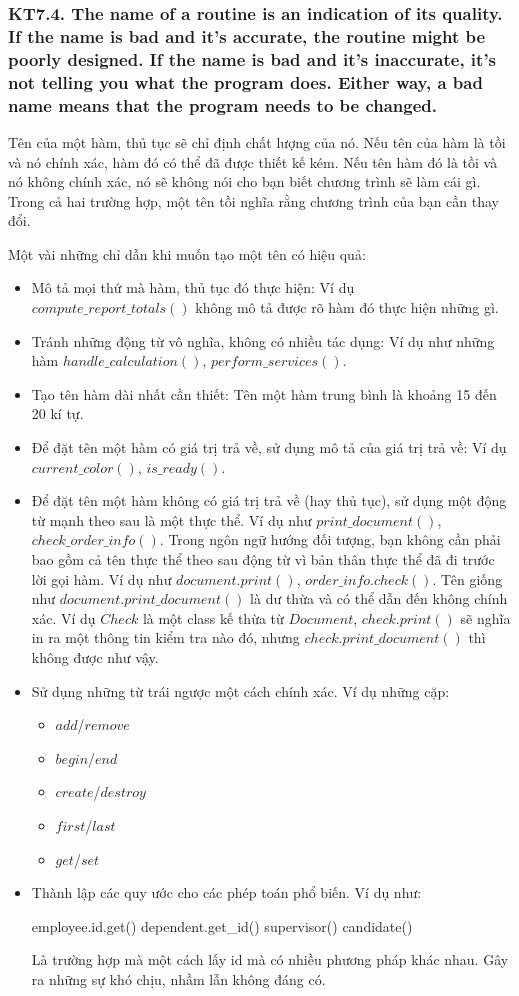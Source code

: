 \documentclass[12pt]{report}
\begin{document}
\subsubsection{KT7.4. The name of a routine is an indication of its quality. If the name is bad and it's accurate, the routine might be poorly designed. If the name is bad and it's inaccurate, it's not telling you what the program does. Either way, a bad name means that the program needs to be changed.}
Tên của một hàm, thủ tục sẽ chỉ định chất lượng của nó. Nếu tên của hàm là tồi và nó chính xác, hàm đó có thể đã được thiết kế kém. Nếu tên hàm đó là tồi và nó không chính xác, nó sẽ không nói cho bạn biết chương trình sẽ làm cái gì. Trong cả hai trường hợp, một tên tồi nghĩa rằng chương trình của bạn cần thay đổi.
\vspace*{3mm}

Một vài những chỉ dẫn khi muốn tạo một tên có hiệu quả: 
\begin{itemize}
	\item Mô tả mọi thứ mà hàm, thủ tục đó thực hiện: Ví dụ $compute\_report\_totals()$ không mô tả được rõ hàm đó thực hiện những gì. 
	\item Tránh những động từ vô nghĩa, không có nhiều tác dụng: Ví dụ như những hàm $handle\_calculation()$, $perform\_services()$.
	\item Tạo tên hàm dài nhất cần thiết: Tên một hàm trung bình là khoảng 15 đến 20 kí tự. 
	\item Để đặt tên một hàm có giá trị trả về, sử dụng mô tả của giá trị trả về: Ví dụ $current\_color()$, $is\_ready()$.
	\item Để đặt tên một hàm không có giá trị trả về (hay thủ tục), sử dụng một động từ mạnh theo sau là một thực thể. Ví dụ như $print\_document()$, $check\_order\_info()$. Trong ngôn ngữ hướng đối tượng, bạn không cần phải bao gồm cả tên thực thể theo sau động từ vì bản thân thực thể đã đi trước lời gọi hàm. Ví dụ như $document.print()$, $order\_info.check()$. Tên giống như $document.print\_document()$ là dư thừa và có thể dẫn đến không chính xác. Ví dụ $Check$ là một class kế thừa từ $Document$, $check.print()$ sẽ nghĩa in ra một thông tin kiểm tra nào đó, nhưng $check.print\_document()$ thì không được như vậy. 
	\item Sử dụng những từ trái ngược một cách chính xác. Ví dụ những cặp:
		\begin{itemize}
			\item $add$/$remove$
			\item $begin$/$end$
			\item $create$/$destroy$			
			\item $first$/$last$
			\item $get$/$set$
		\end{itemize}
	\item Thành lập các quy ước cho các phép toán phổ biến. Ví dụ như:
\begin{python}
employee.id.get()
dependent.get_id()
supervisor()
candidate()
\end{python}
	Là trường hợp mà một cách lấy id mà có nhiều phương pháp khác nhau. Gây ra những sự khó chịu, nhầm lẫn không đáng có.

\end{itemize}
\end{document}
